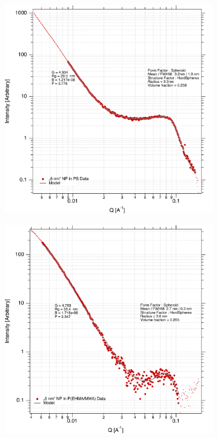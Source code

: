\begin{figure}
	\centering
	\begin{subfigure}[b]{0.42\textwidth}
		\includegraphics[width=\linewidth]{images/ps5.pdf}
	\end{subfigure}
	\begin{subfigure}[b]{0.42\textwidth}
		\includegraphics[width=\linewidth]{images/pmma5.pdf}
	\end{subfigure}


\end{figure}

